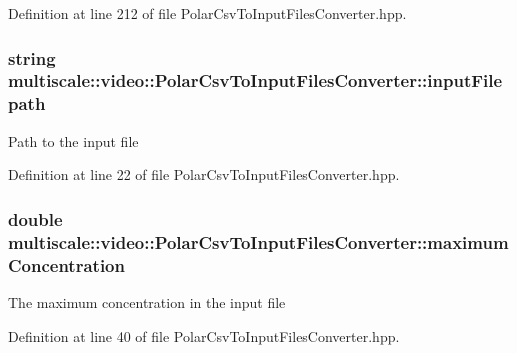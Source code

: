 Definition at line 212 of file Polar\-Csv\-To\-Input\-Files\-Converter.\-hpp.

\hypertarget{classmultiscale_1_1video_1_1PolarCsvToInputFilesConverter_a7b33b6d00b5e0d809f4fb0d76985ab59}{
\subsubsection[{input\-Filepath}]{\setlength{\rightskip}{0pt plus 5cm}string multiscale\-::video\-::\-Polar\-Csv\-To\-Input\-Files\-Converter\-::input\-Filepath\hspace{0.3cm}{\ttfamily [private]}}}\label{classmultiscale_1_1video_1_1PolarCsvToInputFilesConverter_a7b33b6d00b5e0d809f4fb0d76985ab59}
Path to the input file 

Definition at line 22 of file Polar\-Csv\-To\-Input\-Files\-Converter.\-hpp.

\hypertarget{classmultiscale_1_1video_1_1PolarCsvToInputFilesConverter_a89b7dce2825cd5c8c45a1e6f19770e5f}{
\subsubsection[{maximum\-Concentration}]{\setlength{\rightskip}{0pt plus 5cm}double multiscale\-::video\-::\-Polar\-Csv\-To\-Input\-Files\-Converter\-::maximum\-Concentration\hspace{0.3cm}{\ttfamily [private]}}}\label{classmultiscale_1_1video_1_1PolarCsvToInputFilesConverter_a89b7dce2825cd5c8c45a1e6f19770e5f}
The maximum concentration in the input file 

Definition at line 40 of file Polar\-Csv\-To\-Input\-Files\-Converter.\-hpp.

